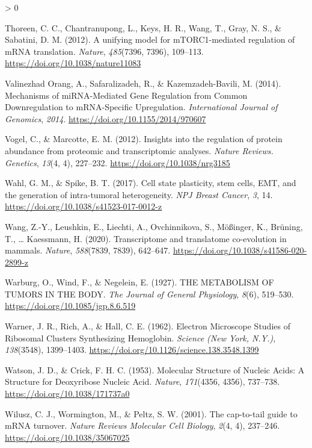 \documentclass[
  12pt,
  openany]{book}
\newlength{\cslhangindent}
\newenvironment{CSLReferences}[2] %
 {%
  \setlength{\parindent}{0pt}
  \ifodd #1 \everypar{\setlength{\hangindent}{\cslhangindent}}\ignorespaces\fi
  \ifnum #2 > 0
  \setlength{\parskip}{#2\baselineskip}
  \fi
 }%
 {}
\begin{document}
\begin{CSLReferences}{1}{0}
\leavevmode\hypertarget{ref-Thoreen2012}{}%
Thoreen, C. C., Chantranupong, L., Keys, H. R., Wang, T., Gray, N. S., \& Sabatini, D. M. (2012). A unifying model for {mTORC1}-mediated regulation of {mRNA} translation. \emph{Nature}, \emph{485}(7396, 7396), 109--113. \url{https://doi.org/10.1038/nature11083}

\leavevmode\hypertarget{ref-ValinezhadOrang2014}{}%
Valinezhad Orang, A., Safaralizadeh, R., \& Kazemzadeh-Bavili, M. (2014). Mechanisms of {miRNA}-{Mediated Gene Regulation} from {Common Downregulation} to {mRNA}-{Specific Upregulation}. \emph{International Journal of Genomics}, \emph{2014}. \url{https://doi.org/10.1155/2014/970607}

\leavevmode\hypertarget{ref-Vogel2012}{}%
Vogel, C., \& Marcotte, E. M. (2012). Insights into the regulation of protein abundance from proteomic and transcriptomic analyses. \emph{Nature Reviews. Genetics}, \emph{13}(4, 4), 227--232. \url{https://doi.org/10.1038/nrg3185}

\leavevmode\hypertarget{ref-Wahl2017}{}%
Wahl, G. M., \& Spike, B. T. (2017). Cell state plasticity, stem cells, {EMT}, and the generation of intra-tumoral heterogeneity. \emph{NPJ Breast Cancer}, \emph{3}, 14. \url{https://doi.org/10.1038/s41523-017-0012-z}

\leavevmode\hypertarget{ref-Wang2020}{}%
Wang, Z.-Y., Leushkin, E., Liechti, A., Ovchinnikova, S., Mößinger, K., Brüning, T., \ldots{} Kaessmann, H. (2020). Transcriptome and translatome co-evolution in mammals. \emph{Nature}, \emph{588}(7839, 7839), 642--647. \url{https://doi.org/10.1038/s41586-020-2899-z}

\leavevmode\hypertarget{ref-Warburg1927}{}%
Warburg, O., Wind, F., \& Negelein, E. (1927). {THE METABOLISM OF TUMORS IN THE BODY}. \emph{The Journal of General Physiology}, \emph{8}(6), 519--530. \url{https://doi.org/10.1085/jgp.8.6.519}

\leavevmode\hypertarget{ref-Warner1962}{}%
Warner, J. R., Rich, A., \& Hall, C. E. (1962). Electron {Microscope Studies} of {Ribosomal Clusters Synthesizing Hemoglobin}. \emph{Science (New York, N.Y.)}, \emph{138}(3548), 1399--1403. \url{https://doi.org/10.1126/science.138.3548.1399}

\leavevmode\hypertarget{ref-Watson1953}{}%
Watson, J. D., \& Crick, F. H. C. (1953). Molecular {Structure} of {Nucleic Acids}: {A Structure} for {Deoxyribose Nucleic Acid}. \emph{Nature}, \emph{171}(4356, 4356), 737--738. \url{https://doi.org/10.1038/171737a0}

\leavevmode\hypertarget{ref-Wilusz2001}{}%
Wilusz, C. J., Wormington, M., \& Peltz, S. W. (2001). The cap-to-tail guide to {mRNA} turnover. \emph{Nature Reviews Molecular Cell Biology}, \emph{2}(4, 4), 237--246. \url{https://doi.org/10.1038/35067025}


\end{CSLReferences}
\end{document}

